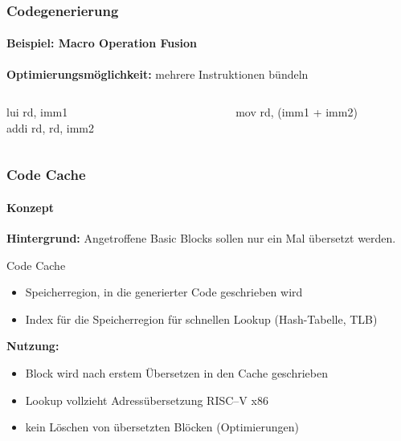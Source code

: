 \begin{frame}
	\frametitle{Codegenerierung}
	\framesubtitle{Beispiel: Macro Operation Fusion}
	
	\textbf{Optimierungsmöglichkeit:} mehrere Instruktionen bündeln
	
	\vspace{2cm}
	
	\begin{columns}[onlytextwidth]
		\ttfamily
		\begin{column}{0.45\textwidth}
			\centering
			lui rd, imm1\\
			addi rd, rd, imm2
		\end{column}
		
		\begin{column}{0.05\textwidth}
			\centering
			\conclude
		\end{column}
		
		\begin{column}{0.45\textwidth}
			\centering
			mov rd, (imm1 + imm2)
		\end{column}
	\end{columns}
\end{frame}


\begin{frame}
	\frametitle{Code Cache}
	\framesubtitle{Konzept}
	
	\textbf{Hintergrund:} Angetroffene Basic Blocks sollen nur ein Mal übersetzt werden.
	
	\vspace{0.50cm}
	
	\begin{block}{Code Cache}
		\begin{itemize}
			\item Speicherregion, in die generierter Code geschrieben wird
			\item Index für die Speicherregion für schnellen Lookup ( Hash-Tabelle, TLB)
		\end{itemize}
	\end{block}
	
	\vspace{0.50cm}
	
	\textbf{Nutzung:}
	
	\begin{itemize}
		\item Block wird nach erstem Übersetzen in den Cache geschrieben
		\item Lookup vollzieht Adressübersetzung RISC--V  x86
		\item kein Löschen von übersetzten Blöcken ( Optimierungen)
	\end{itemize}
\end{frame}


